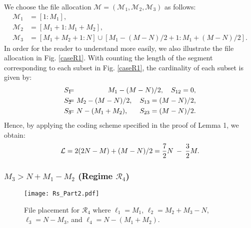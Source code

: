 \documentclass[conference]{IEEEtran}
\begin{document}
We choose the file allocation $\mathcal{M}=(\mathcal{M}_1,\mathcal{M}_2,\mathcal{M}_3)$ as follows:
\begin{equation}
\begin{aligned}
\mathcal{M}_1&=[1:M_1],\\
\mathcal{M}_2&=[M_1+1:M_1+M_2],\\
\mathcal{M}_3&=[M_1+M_2+1:N]\cup[M_1-(M-N)/2+1:M_1+(M-N)/2].
\end{aligned}
\end{equation}
In order for the reader to understand more easily, we also illustrate the file allocation in Fig. \ref{caseR1}. With counting the length of the segment corresponding to each subset in Fig. \ref{caseR1}, the cardinality of each subset is given by:
\begin{eqnarray}
S_1&\!\!\!\!=\!\!\!\!&M_1-(M-N)/2,~~~S_{12} = 0,\notag\\
S_2&\!\!\!\!=\!\!\!\!&M_2-(M-N)/2,~~~S_{13} = (M-N)/2,\\
S_3&\!\!\!\!=\!\!\!\!&N-(M_1+M_2),~~~~~S_{23} = (M-N)/2.\notag
\end{eqnarray}
Hence, by applying the coding scheme specified in the proof of Lemma 1, we obtain:
\begin{equation}
{\mathcal L}=2(2N-M)+(M-N)/2=\frac{7}{2}N\hspace{.8mm}-\hspace{.8mm}\frac{3}{2}M.
\end{equation}


\subsubsection{$M_3>N+M_1-M_2$ (Regime $\mathcal{R}_4$)}

\begin{figure}[!t] \centering %
\texttt{[image: Rs\_Part2.pdf]}\vspace{-0.2in}
\caption{File placement for ${\mathcal R}_4$ where ${\ell}_1=M_1$, ${\ell}_2=M_2+M_3-N$, ${\ell}_3=N-M_3$, and ${\ell}_4=N-(M_1+M_2)$.}\label{caseR4}%
\end{figure}
\end{document}
